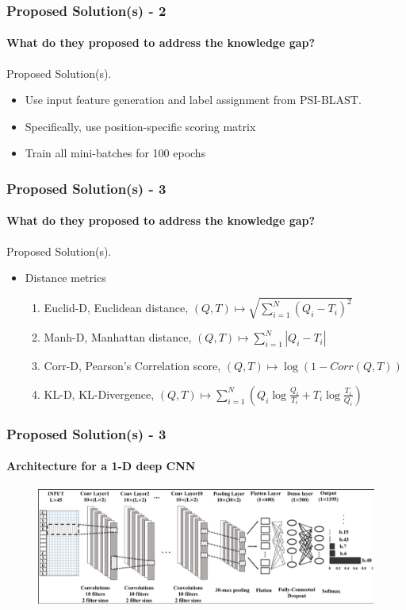 \documentclass[xcolor={usenames,dvipsnames},hyperref={hyperindex,bookmarks}]{beamer}
\begin{document}
\frame
{
	\frametitle{Proposed Solution(s) - 2}
	\framesubtitle{What do they proposed to address the knowledge gap?}

	Proposed Solution(s).
	\begin{itemize}
	\item Use input feature generation and label assignment from PSI-BLAST.
	\item Specifically, use position-specific scoring matrix
	\item Train all mini-batches for 100 epochs
	\end{itemize}
}



\frame
{
	\frametitle{Proposed Solution(s) - 3}
	\framesubtitle{What do they proposed to address the knowledge gap?}

	Proposed Solution(s).
	\begin{itemize}
	\item Distance metrics
		\begin{enumerate} 
		\item Euclid-D, Euclidean distance, $(Q, T) \mapsto \sqrt{\displaystyle\sum_{i = 1}^{N} (Q_{i} - T_{i})^{2}}$
		\item Manh-D, Manhattan distance, $(Q, T) \mapsto \displaystyle\sum_{i = 1}^{N} |Q_{i} - T_{i}|$
		\item Corr-D, Pearson's Correlation score, $(Q, T) \mapsto \log{(1 - Corr(Q, T))}$
		\item KL-D, KL-Divergence, $(Q, T) \mapsto \displaystyle\sum_{i = 1}^{N} (Q_{i}\log{\frac{Q_{i}}{T_{i}} + T_{i}\log\frac{T_{i}}{Q_{i}}})$
		\end{enumerate}
	\end{itemize}
}







\frame
{
	\frametitle{Proposed Solution(s) - 3}
	\framesubtitle{Architecture for a 1-D deep CNN}


	\begin{figure}[h]
	\centering 
	\includegraphics[height=1.5in]{./pics/1-d-cnn-architecture}
	\label{fig:1DdeepCNNarch}
	\end{figure}
}
\end{document}
